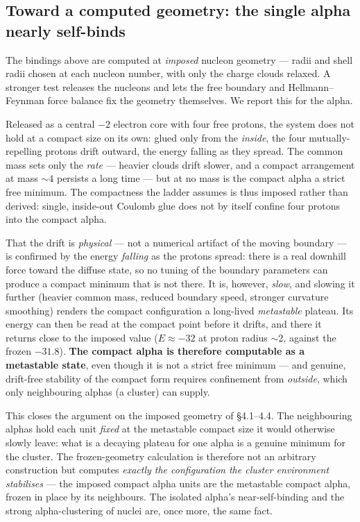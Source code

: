 \documentclass[11pt]{article}
\begin{document}
\subsection{Toward a computed geometry: the single alpha nearly self-binds}
\label{sec:computed-geom}

The bindings above are computed at \emph{imposed} nucleon geometry --- radii and shell radii
chosen at each nucleon number, with only the charge clouds relaxed. A stronger test releases the
nucleons and lets the free boundary and Hellmann--Feynman force balance fix the geometry
themselves. We report this for the alpha.

Released as a central $-2$ electron core with four free protons, the system does not hold at a
compact size on its own: glued only from the \emph{inside}, the four mutually-repelling protons
drift outward, the energy falling as they spread. The common mass sets only the \emph{rate} ---
heavier clouds drift slower, and a compact arrangement at mass ${\sim}4$ persists a long time ---
but at no mass is the compact alpha a strict free minimum. The compactness the ladder assumes is
thus imposed rather than derived: single, inside-out Coulomb glue does not by itself confine four
protons into the compact alpha.

That the drift is \emph{physical} --- not a numerical artifact of the moving boundary --- is
confirmed by the energy \emph{falling} as the protons spread: there is a real downhill force
toward the diffuse state, so no tuning of the boundary parameters can produce a compact minimum
that is not there. It is, however, \emph{slow}, and slowing it further (heavier common mass,
reduced boundary speed, stronger curvature smoothing) renders the compact configuration a
long-lived \emph{metastable} plateau. Its energy can then be read at the compact point before it
drifts, and there it returns close to the imposed value ($E\approx -32$ at proton radius ${\sim}2$,
against the frozen $-31.8$). \textbf{The compact alpha is therefore computable as a metastable
state}, even though it is not a strict free minimum --- and genuine, drift-free stability of the
compact form requires confinement from \emph{outside}, which only neighbouring alphas (a cluster)
can supply.

This closes the argument on the imposed geometry of \S4.1--4.4. The neighbouring alphas hold each
unit \emph{fixed} at the metastable compact size it would otherwise slowly leave: what is a
decaying plateau for one alpha is a genuine minimum for the cluster. The frozen-geometry
calculation is therefore not an arbitrary construction but computes \emph{exactly the
configuration the cluster environment stabilises} --- the imposed compact alpha units are the
metastable compact alpha, frozen in place by its neighbours. The isolated alpha's near-self-binding
and the strong alpha-clustering of nuclei are, once more, the same fact.
\end{document}
